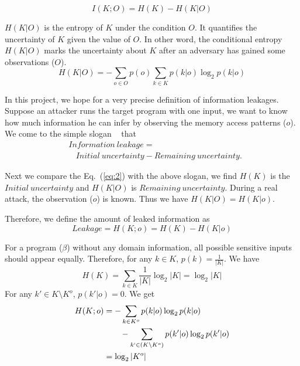 
\begin{equation} \label{eq:2}
    I(K;O) = H(K) - H(K|O)
\end{equation}

$H(K|O)$ is the entropy of $K$ under the condition $O$. It quantifies the
uncertainty of $K$ given the value of $O$. In other word, the conditional
entropy $H(K|O)$ marks the uncertainty about $K$ after an adversary has gained
some observations ($O$).
\begin{equation}
    H(K|O) = - \sum_{o {\in} O} {p(o) \sum_{k {\in} K}{p(k|o)\log_2p(k|o)}}
\end{equation}

In this project, we hope for a very precise definition of information
leakages. Suppose an attacker runs the target program with one
input, we want to know how much information he can infer by observing the
memory access patterns ($o$). We come to the simple slogan
~\cite{10.1007/978-3-642-00596-1_21} %
that
\begin{align*}
     & \mathit{Information\ leakage} =                                         \\
     & ~~~~ \mathit{Initial\ uncertainty} - \mathit{Remaining\ uncertainty}.
\end{align*}

Next we compare the Eq.~(\ref{eq:2}) with the above slogan, we find $H(K)$
is the $\mathit{Initial\ uncertainty}$ and $H(K|O)$ is $\mathit{Remaining\
uncertainty}$. During a real attack, the observation ($o$) is known. Thus we
have $H(K|O) = H(K|o)$.

Therefore, we define the amount of leaked information as
\begin{displaymath}
    Leakage = H(K;o) = H(K) - H(K|o)
\end{displaymath}

For a program ($\beta$) without any domain information, all possible sensitive
inputs should appear equally. Therefore, for any $k \in K$, $p(k) =
\frac{1}{|K|}$. We have
$$H(K) = \sum_{k {\in} K}\frac{1}{|K|}\log_2{|K|} = \log_2{|K|}$$
For any $k' \in K \setminus K^o$, $p(k'|o) = 0$. We get
\begin{align*}
    H(K;o) & = - \sum_{k {\in} K^o}{p(k|o)\log_2p(k|o)}                         \\
           & \qquad   - \sum_{k` {\in} (K \setminus K^o)}{p(k'|o)\log_2p(k'|o)} \\
           & = \log_2{|K^o|}
\end{align*}

